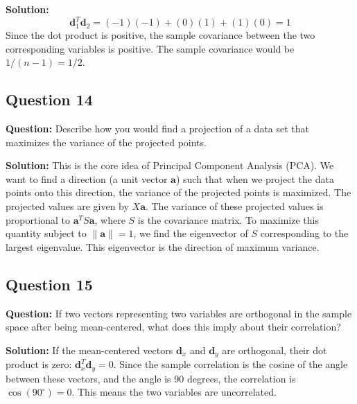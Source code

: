\textbf{Solution:}
$$ \mathbf{d}_1^T \mathbf{d}_2 = (-1)(-1) + (0)(1) + (1)(0) = 1 $$
Since the dot product is positive, the sample covariance between the two corresponding variables is positive. The sample covariance would be $1 / (n-1) = 1/2$.

\subsection*{Question 14}
\textbf{Question:} Describe how you would find a projection of a data set that maximizes the variance of the projected points.

\textbf{Solution:}
This is the core idea of Principal Component Analysis (PCA). We want to find a direction (a unit vector $\mathbf{a}$) such that when we project the data points onto this direction, the variance of the projected points is maximized. The projected values are given by $X\mathbf{a}$. The variance of these projected values is proportional to $\mathbf{a}^T S \mathbf{a}$, where $S$ is the covariance matrix. To maximize this quantity subject to $\|\mathbf{a}\|=1$, we find the eigenvector of $S$ corresponding to the largest eigenvalue. This eigenvector is the direction of maximum variance.

\subsection*{Question 15}
\textbf{Question:} If two vectors representing two variables are orthogonal in the sample space after being mean-centered, what does this imply about their correlation?

\textbf{Solution:}
If the mean-centered vectors $\mathbf{d}_x$ and $\mathbf{d}_y$ are orthogonal, their dot product is zero: $\mathbf{d}_x^T \mathbf{d}_y = 0$. Since the sample correlation is the cosine of the angle between these vectors, and the angle is 90 degrees, the correlation is $\cos(90^\circ) = 0$. This means the two variables are uncorrelated.
